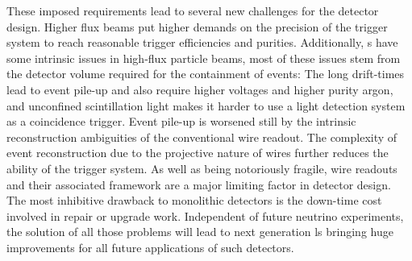 These imposed requirements lead to several new challenges for the detector design.
Higher flux beams put higher demands on the precision of the trigger system to reach reasonable trigger efficiencies and purities.
Additionally, \lartpc s have some intrinsic issues in high-flux particle beams, most of these issues stem from the detector volume required for the containment of events:
The long drift-times lead to event pile-up and also require higher voltages and higher purity argon, and unconfined scintillation light makes it harder to use a light detection system as a coincidence trigger.
Event pile-up is worsened still by the intrinsic reconstruction ambiguities of the conventional wire readout.
The complexity of event reconstruction due to the projective nature of wires further reduces the ability of the trigger system.
As well as being notoriously fragile, wire readouts and their associated framework are a major limiting factor in detector design.
The most inhibitive drawback to monolithic detectors is the down-time cost involved in repair or upgrade work.
Independent of future neutrino experiments, the solution of all those problems will lead to next generation l\lartpc s bringing huge improvements for all future applications of such detectors.